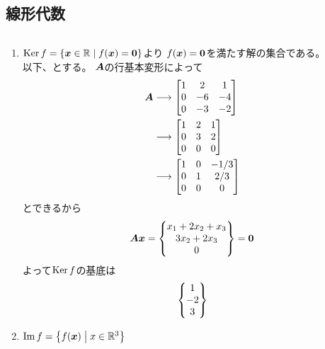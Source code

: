 \subsection{線形代数}
\begin{ans*}
  ${}$
  \begin{enumerate}[label=(\arabic*)]
    \item $\operatorname{Ker} f=\left\{ {\bm{x}}\in \mathbb{R}\mathrel{}\middle| \mathrel{} f({\bm{x}}) = \bm{0} \right\}$より
    $f({\bm{x}})=\bm{0}$を満たす解の集合である。\\以下、とする。
    $\bm{A}$の行基本変形によって
    \begin{align}
      \bm{A}
      &\longrightarrow \begin{bmatrix}
        1 & 2 & 1 \\
        0 & -6 & -4 \\
        0 & -3 & -2
      \end{bmatrix} \\
      &\longrightarrow \begin{bmatrix}
        1 & 2 & 1 \\
        0 & 3 & 2 \\
        0 & 0 & 0
      \end{bmatrix} \\
      &\longrightarrow \begin{bmatrix}
        1 & 0 & -1/3 \\
        0 & 1 & 2/3 \\
        0 & 0 & 0
      \end{bmatrix}
    \end{align}
    とできるから
    \begin{gather}
      \bm{A}{\bm{x}} =
      \begin{Bmatrix}
        x_1 + 2x_2 + x_3 \\
        3x_2 + 2x_3 \\
        0
      \end{Bmatrix}=\bm{0}
    \end{gather}
    よって$\operatorname{Ker} f$の基底は
    \begin{gather}
      \begin{Bmatrix}
        1 \\ -2 \\ 3
      \end{Bmatrix}
    \end{gather}
    \item $\operatorname{Im} f =\left\{ f({\bm{x}})\mathrel{}\middle| \mathrel{} x\in\mathbb{R}^3 \right\}$

\end{enumerate}
\end{ans*}
